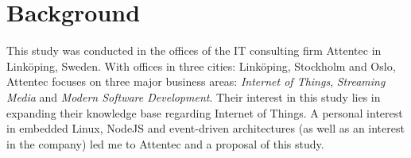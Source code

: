 \chapter{Background}
\label{cha:background}

This study was conducted in the offices of the IT consulting firm Attentec in
Linköping, Sweden. With offices in three cities: Linköping, Stockholm and Oslo,
Attentec focuses on three major business areas: \textit{Internet of Things},
\textit{Streaming Media} and \textit{Modern Software Development}. Their
interest in this study lies in expanding their knowledge base regarding
Internet of Things. A personal interest in embedded Linux, NodeJS and
event-driven architectures (as well as an interest in the company) led me to
Attentec and a proposal of this study.
